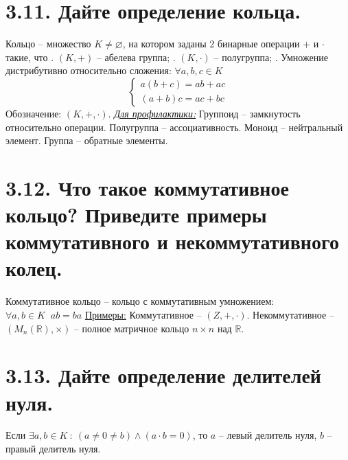 \documentclass{article}
\begin{document}
\section*{\LARGE 3.11. Дайте определение кольца. }
Кольцо -- множество $K \ne \varnothing$, на котором заданы 2 бинарные операции $+$ и $\cdot$ такие, что
\newline{}. $(K, +)$ -- абелева группа;
\newline{}. $(K, \cdot)$ -- полугруппа;
\newline{}. Умножение дистрибутивно относительно сложения: $\forall a,b,c \in K$
$$
\begin{cases}
a(b + c) = ab + ac \\
(a + b)c = ac + bc 
\end{cases}
$$
Обозначение: $(K, +, \cdot)$.
\newline \underline{\textit{Для профилактики:}}
\newline Группоид -- замкнутость относительно операции.
\newline Полугруппа -- ассоциативность.
\newline Моноид -- нейтральный элемент.
\newline Группа -- обратные элементы.

\section*{\LARGE 3.12. Что такое коммутативное кольцо? Приведите примеры коммутативного и некоммутативного колец. }
Коммутативное кольцо -- кольцо с коммутативным умножением: $\forall a,b \in K \;\; ab = ba$
\newline \underline{Примеры:}
\newline Коммутативное -- $(Z, +, \cdot)$.
\newline Некоммутативное -- $(M_n(\mathbb{R}), \times)$ -- полное матричное кольцо $n\times n$ над $\mathbb{R}$.

\section*{\LARGE 3.13. Дайте определение делителей нуля. }
Если $\exists a,b \in K \::\: (a \ne 0 \ne b) \wedge (a\cdot b = 0)$, то $a$ -- левый делитель нуля, $b$ -- правый делитель нуля. 
\end{document}
